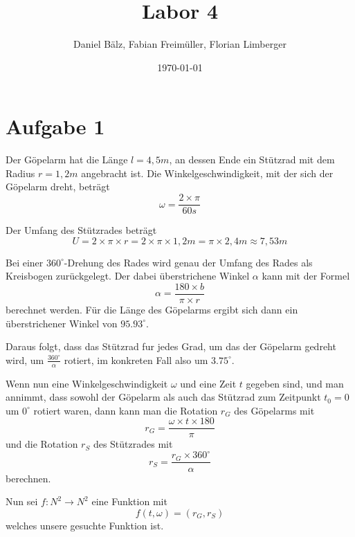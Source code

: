 \documentclass[a4paper,12pt]{article}
\begin{document}
\title{Labor 4}
\author{Daniel Bälz, Fabian Freimüller, Florian Limberger}
\date{\today}

\maketitle

\section{Aufgabe 1}

Der Göpelarm hat die Länge $l=4,5m$, an dessen Ende ein Stützrad mit dem Radius $r=1,2m$ angebracht ist. Die Winkelgeschwindigkeit, mit der sich der Göpelarm dreht, beträgt
$$\omega = \frac{2 \times \pi}{60s}$$

Der Umfang des Stützrades beträgt
$$U = 2 \times \pi \times r = 2 \times \pi \times 1,2m = \pi \times 2,4m \approx 7,53m$$

Bei einer $360^{\circ}$-Drehung des Rades wird genau der Umfang des Rades als Kreisbogen zurückgelegt. Der dabei überstrichene Winkel $\alpha$ kann mit der Formel
$$\alpha = \frac{180 \times b}{\pi \times r}$$
berechnet werden. Für die Länge des Göpelarms ergibt sich dann ein überstrichener Winkel von $95.93^{\circ}$.

Daraus folgt, dass das Stützrad fur jedes Grad, um das der Göpelarm gedreht wird, um $\frac{360^{\circ}}{\alpha}$ rotiert, im konkreten Fall also um $3.75^{\circ}$.

Wenn nun eine Winkelgeschwindigkeit $\omega$ und eine Zeit $t$ gegeben sind, und man annimmt, dass sowohl der Göpelarm als auch das Stützrad zum Zeitpunkt $t_{0} = 0$ um $0^{\circ}$ rotiert waren, dann kann man die Rotation $r_{G}$ des Göpelarms mit
$$r_{G} = \frac{\omega \times t \times 180}{\pi}$$
und die Rotation $r_{S}$ des Stützrades mit
$$r_{S} = \frac{r_{G} \times 360^{\circ}}{\alpha}$$
berechnen.

Nun sei $f: N^2 \rightarrow N^2$ eine Funktion mit
$$f(t, \omega) = (r_{G}, r_{S})$$
welches unsere gesuchte Funktion ist.
\end{document}
